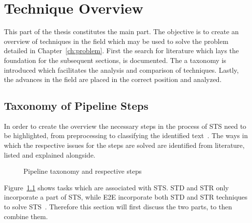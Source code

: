\chapter{Technique Overview}\label{ch:research}
This part of the thesis constitutes the main part.
The objective is to create an overview of techniques in the field which may be used to solve the
problem detailed in Chapter~\ref{ch:problem}.
First the search for literature which lays the foundation for the subsequent sections, is documented.
The a taxonomy is introduced which facilitates the analysis and comparison of techniques.
Lastly, the advances in the field are placed in the correct position and analyzed.

\section{Taxonomy of Pipeline Steps}
In order to create the overview the necessary steps in the process of \ac{STS} need to be highlighted,
from preprocessing to classifying the identified text~\citep{long_scene_2021, sourvanos_challenges_2018}.
The ways in which the respective issues for the steps are solved are identified from literature,
listed and explained alongside.
\begin{figure}[h]
    \centering
    
\caption{Pipeline taxonomy and respective steps\label{fig:pipelineSteps}}
\end{figure}
Figure~\ref{fig:pipelineSteps} shows tasks which are associated with \ac{STS}.
\ac{STD} and \ac{STR} only incorporate a part of \ac{STS}, while E2E
incorporate both \ac{STD} and \ac{STR} techniques to solve \ac{STS}~\citep{long_scene_2021}.
Therefore this section will first discuss the two parts, to then combine them.

